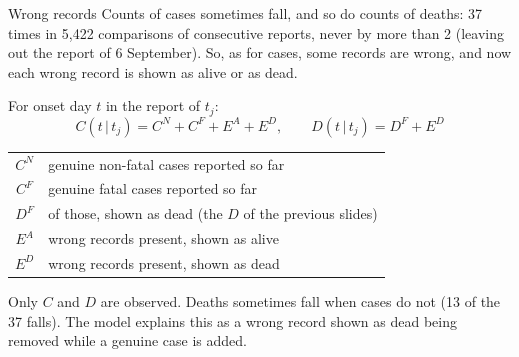 \documentclass[aspectratio=169,9pt]{beamer}
\newcommand{\given}{\,|\,}
\begin{document}
\begin{frame}{Wrong records}
Counts of cases sometimes fall, and so do counts of deaths: 37 times in
5{,}422 comparisons of consecutive reports, never by more than 2 (leaving out
the report of 6 September). So, as for cases, some records are wrong, and
now each wrong record is shown as alive or as dead.

\medskip
For onset day $t$ in the report of $t_j$:
\[
C(t\given t_j)=C^{N}+C^{F}+E^{A}+E^{D},\qquad
D(t\given t_j)=D^{F}+E^{D}
\]

\begin{center}
\renewcommand{\arraystretch}{1.25}
\begin{tabular}{cl}
\toprule
$C^{N}$ & genuine non-fatal cases reported so far \\
$C^{F}$ & genuine fatal cases reported so far \\
$D^{F}$ & of those, shown as dead (the $D$ of the previous slides) \\
$E^{A}$ & wrong records present, shown as alive \\
$E^{D}$ & wrong records present, shown as dead \\
\bottomrule
\end{tabular}
\end{center}

\smallskip
Only $C$ and $D$ are observed. Deaths sometimes fall when cases do not (13
of the 37 falls). The model explains this as a wrong record shown as dead
being removed while a genuine case is added.
\end{frame}
\end{document}
